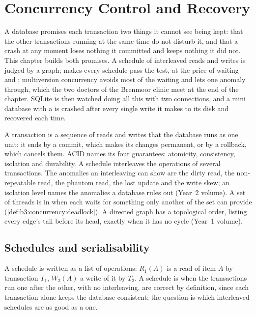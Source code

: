 \chapter{Concurrency Control and Recovery}\label{ch:b3:transactions-and-recovery}

A database promises each transaction two things it cannot see being kept: that the other transactions running at the same time do not disturb it, and that a crash at any moment loses nothing it committed and keeps nothing it did not. This chapter builds both promises. A schedule of interleaved reads and writes is judged by a graph;  makes every schedule pass the test, at the price of waiting and ; multiversion concurrency avoids most of the waiting and lets one anomaly through, which the two doctors of the Brenmoor clinic meet at the end of the chapter. SQLite is then watched doing all this with two connections, and a mini database with a  is crashed after every single write it makes to its disk and recovered each time.

\begin{recall}
A transaction is a sequence of reads and writes that the database runs as one unit: it ends by a commit, which makes its changes permanent, or by a rollback, which cancels them. ACID names its four guarantees: atomicity, consistency, isolation and durability. A schedule interleaves the operations of several transactions. The anomalies an interleaving can show are the dirty read, the non-repeatable read, the phantom read, the lost update and the write skew; an isolation level names the anomalies a database rules out (Year~2 volume). A set of threads is in  when each waits for something only another of the set can provide (\cref{def:b3:concurrency:deadlock}). A directed graph has a topological order, listing every edge's tail before its head, exactly when it has no cycle (Year~1 volume).
\end{recall}

\section{Schedules and serialisability}\label{sec:b3:transactions-and-recovery:schedules}

A schedule is written as a list of operations: $R_1(A)$ is a read of item $A$ by transaction $T_1$, $W_2(A)$ a write of it by $T_2$. A schedule is  when the transactions run one after the other, with no interleaving.  are correct by definition, since each transaction alone keeps the database consistent; the question is which interleaved schedules are as good as a  one.

